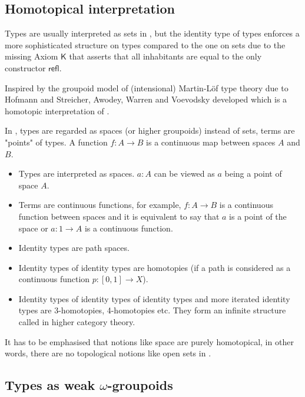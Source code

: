 \subsection{Homotopical interpretation}\label{hottinterpretation}

Types are usually interpreted as sets in \mltt, but the identity type of types enforces a more sophisticated structure on types compared to the one on sets due to the missing Axiom $\mathsf{K}$ that asserts that all inhabitants are equal to the only constructor $\mathsf{refl}$. 

Inspired by the groupoid model of (intensional) Martin-Löf type theory due to Hofmann and Streicher, Awodey, Warren \cite{awodey-warren} and Voevodsky \cite{VV} developed \hott which is a homotopic interpretation of \mltt.

In \hott, types are regarded as spaces (or higher groupoids) instead of sets, terms are "points" of types. A function $f : A \to B$ is a continuous map between spaces $A$ and $B$.

\begin{itemize}
\item Types are interpreted as spaces. $a : A$ can be viewed as $a$ being
  a point of space $A$.
\item Terms are continuous functions, for example, $f : A \rightarrow B$ is a
  continuous function between spaces and it is equivalent to say that $a$ is
  a point of the space or $a : 1 \rightarrow A$ is a continuous function.
\item Identity types are path spaces.
\item Identity types of identity types are homotopies (if a path is considered as a continuous function $p : [0,1] \rightarrow X$).
\item Identity types of identity types of identity types and more iterated identity types are 3-homotopies, 4-homotopies etc. They form an infinite structure called \og in higher category theory.
\end{itemize}

\begin{remark}
It has to be emphasised that notions like space are purely homotopical, in other words, there are no topological notions like open sets in \hott. 
\end{remark}


\subsection{Types as weak $\omega$-groupoids}\label{wogintro}

